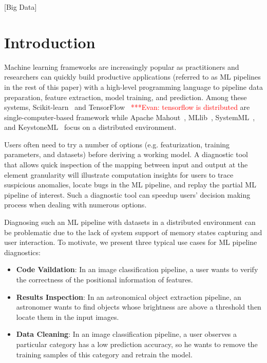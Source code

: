 \documentclass{sig-alternate}
\newcommand{\evannote}[1]{{\textcolor{red}    { ***Evan:      #1 }}}
\newcommand{\evannote}[1]{}
\newenvironment{shortlist}{
        \vspace*{-0.5em}
  \begin{itemize}
  \setlength{\itemsep}{-0.1em}
}{
  \end{itemize}
        \vspace*{-0.5em}
}
\begin{document}
[Big Data]

\section{Introduction}
Machine learning frameworks are increasingly popular as practitioners and researchers can quickly
build productive applications (referred to as ML pipelines in the rest of this paper) with a high-level 
programming language to pipeline data preparation, feature extraction, model training, 
and prediction. 
Among these systems, Scikit-learn~\cite{pedregosa2011scikit} and TensorFlow~\cite{tensorflow15} \evannote{tensorflow is distributed}
are single-computer-based framework while Apache Mahout~\cite{owen2011mahout}, MLlib~\cite{meng2015mllib}, 
SystemML~\cite{ghoting11systemml}, and KeystoneML~\cite{sparks15} focus on a distributed environment.

Users often need to try a number of options (e.g. featurization, training parameters, and datasets) before
deriving a working model. 
A diagnostic tool that allows quick inspection of the mapping between input and output at the element granularity 
will illustrate computation insights for users to trace suspicious anomalies, locate bugs in the ML pipeline, and
replay the partial ML pipeline of interest.
Such a diagnostic tool can speedup users' decision making process when dealing with numerous options.

Diagnosing such an ML pipeline with datasets in a distributed environment can be problematic due to
the lack of system support of memory states capturing and user interaction.
To motivate, we present three typical use cases for ML pipeline diagnostics:
\begin{shortlist}
\item{\bf Code Vaildation}: In an image classification pipeline, a user wants to verify the correctness of 
the positional information of features. 
\item{\bf Results Inspection}: In an astronomical object extraction pipeline, an astronomer wants to find objects whose
brightness are above a threshold then locate them in the input images.
\item{\bf Data Cleaning}: In an image classification pipeline, a user observes a particular category has
a low prediction accuracy, so he wants to remove the training samples of this category and retrain
the model.
\end{shortlist}
\end{document}
